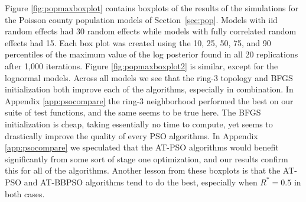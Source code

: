 \documentclass[12pt]{article}
\begin{document}
Figure \ref{fig:popmaxboxplot} contains boxplots of the results of the simulations for the Poisson county population models of Section~\ref{sec:pop}. Models with iid random effects had 30 random effects while models with fully correlated random effects had 15. Each box plot was created using the 10, 25, 50, 75, and 90 percentiles of the maximum value of the log posterior found in all 20 replications after 1,000 iterations. Figure \ref{fig:popmaxboxplot2} is similar, except for the lognormal models. Across all models we see that the ring-3 topology and BFGS initialization both improve each of the algorithms, especially in combination. In  Appendix \ref{app:psocompare} the ring-3 neighborhood performed the best on our suite of test functions, and the same seems to be true here. The BFGS initialization is cheap, taking essentially no time to compute, yet seems to drastically improve the quality of every PSO algorithms. In  Appendix \ref{app:psocompare} we speculated that the AT-PSO algorithms would benefit significantly from some sort of stage one optimization, and our results confirm this for all of the algorithms. Another lesson from these boxplots is that the AT-PSO and AT-BBPSO algorithms tend to do the best, especially when $R^*=0.5$ in both cases. 
\end{document}
